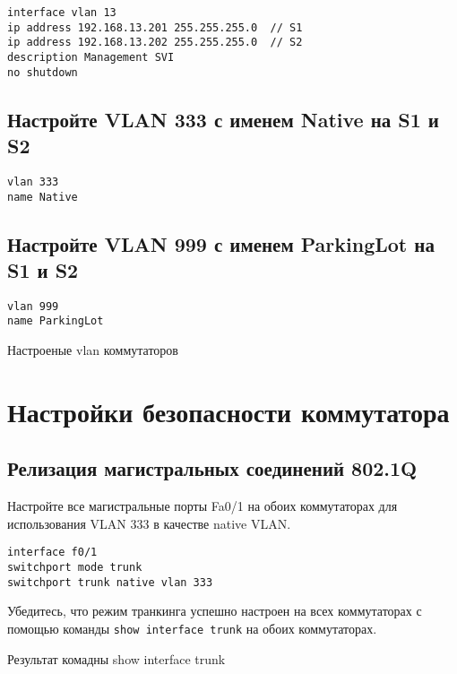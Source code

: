\begin{verbatim}
interface vlan 13
ip address 192.168.13.201 255.255.255.0  // S1
ip address 192.168.13.202 255.255.255.0  // S2
description Management SVI
no shutdown
\end{verbatim}

\subsection{Настройте VLAN 333 с именем Native на S1 и S2}

\begin{verbatim}
vlan 333
name Native
\end{verbatim}

\subsection{Настройте VLAN 999 с именем ParkingLot на S1 и S2}

\begin{verbatim}
vlan 999
name ParkingLot
\end{verbatim}

\begin{image}
	\caption{Настроеные vlan коммутаторов}
\end{image}

\section{Настройки безопасности коммутатора}

\subsection{Релизация магистральных соединений 802.1Q}

Настройте все магистральные порты Fa0/1 на обоих коммутаторах
для использования VLAN 333 в качестве native VLAN.

\begin{verbatim}
interface f0/1
switchport mode trunk
switchport trunk native vlan 333
\end{verbatim}

Убедитесь, что режим транкинга успешно настроен на всех коммутаторах
с помощью команды \texttt{show interface trunk} на обоих коммутаторах.

\begin{image}
	\caption{Результат комадны show interface trunk}
\end{image}

